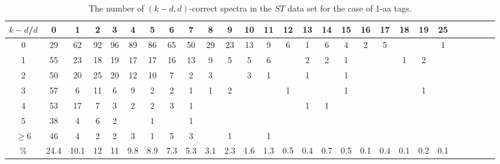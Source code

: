 \documentclass{article}[12pt]
\begin{document}
\begin{landscape}

\begin{table}[h]\footnotesize
{\centering
\begin{tabular}{|c|c|
c|c|c|c|c|c|c|c|c|c|c|c|c|c|c|c|c|c|c|c|c|c|c|c|c|}
  \hline
  $k-d$/$d$ 
 & 0 & 1 & 2 & 3 & 4 & 5 & 6 & 7 & 8 & 9 & 10 & 11 & 12 & 13 & 14 & 15 & 16 & 17 & 18 & 19 & 25\\

  \hline
  \hline

0 & 29 & 62 & 92 & 96 & 89 & 86 & 65 & 50 & 29 & 23 & 13 & 9 & 6 & 1 & 6 & 4 & 2 & 5 &  &  & 1\\

1 & 55 & 23 & 18 & 19 & 17 & 17 & 16 & 13 & 9 & 5 & 5 & 6 &  & 2 & 2 & 1 &  &  & 1 & 2 & \\

2 & 50 & 20 & 25 & 20 & 12 & 10 & 7 & 2 & 3 &  & 3 & 1 &  & 1 &  & 1 &  &  &  &  & \\

3 & 57 & 6 & 11 & 6 & 9 & 2 & 2 & 1 & 1 & 2 &  &  & 1 &  &  & 1 &  &  &  & 1 & \\

4 & 53 & 17 & 7 & 3 & 2 & 2 & 3 & 1 &  &  &  &  &  & 1 & 1 &  &  &  &  &  & \\

5 & 38 & 4 & 6 & 2 &  & 1 &  & 1 &  &  &  &  &  &  &  &  &  &  &  &  & \\

$\ge6 $  & 46 & 4 & 2 & 2 & 3 & 1 & 5 & 3 &  & 1 &  & 1 &  &  &  &  &  &  &  &  & \\

  \hline

 \%  & 24.4 & 10.1 & 12 & 11 & 9.8 & 8.9 & 7.3 & 5.3 & 3.1 & 2.3 & 1.6 & 1.3 & 0.5 & 0.4 & 0.7 & 0.5 & 0.1 & 0.4 & 0.1 & 0.2 & 0.1\\

  \hline
\end{tabular}
\par}
\centering
\caption{The number of $(k-d,d)$-correct spectra in the $ST$ data set for the case of 1-aa tags.}
\vspace{3mm}
\label{table:kd-1-correct-ST2}
\end{table}
\end{landscape}
\end{document}
